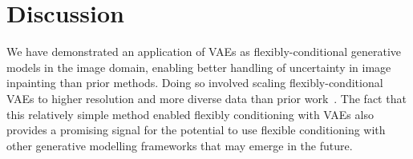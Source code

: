 

\section{Discussion}

We have demonstrated an application of VAEs as flexibly-conditional generative models in the image domain, enabling better handling of uncertainty in image inpainting than prior methods. Doing so involved scaling flexibly-conditional VAEs to higher resolution and more diverse data than prior work~\citep{ivanov2018variational}. The fact that this relatively simple method enabled flexibly conditioning with VAEs also provides a promising signal for the potential to use flexible conditioning with other generative modelling frameworks that may emerge in the future.
